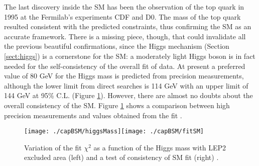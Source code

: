 The last discovery inside the SM has been the observation of the top quark in 1995 at the Fermilab's experiments CDF and D0. The mass of the top quark resulted consistent with the predicted constraints, thus confirming the SM as an accurate framework. There is a missing piece, though, that could invalidate all the previous beautiful confirmations, since the Higgs mechanism (Section \ref{sect:higgs}) is a cornerstone for the SM: a moderately light Higgs boson is in fact needed for the self-consistency of the overall fit of data. At present a preferred value of 80 GeV for the Higgs mass is predicted from precision measurements, although the lower limit from direct searches is 114 GeV with an upper limit of 144 GeV at 95\% C.L. \cite{Renton} (Figure \ref{higgsMass}). However, there are almost no doubts about the overall consistency of the SM. Figure \ref{higgsMass} shows a comparison between high precision measurements and values obtained from the fit \cite{Renton}.

\begin{figure}[htb]\begin{center}
\texttt{[image: ./capBSM/higgsMass]}\hspace{.7cm}\texttt{[image: ./capBSM/fitSM]}\caption{Variation of the fit $\chi^2$ as a function of the Higgs mass with LEP2 excluded area (left) and a test of consistency of SM fit (right) \cite{Renton}.}
\label{higgsMass}\end{center}\end{figure}

